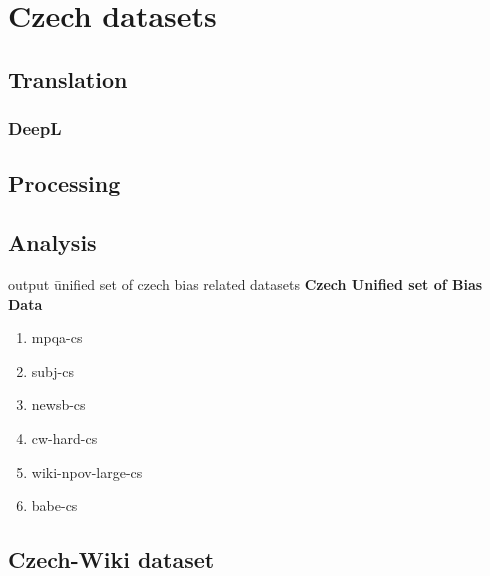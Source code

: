 \chapter{Czech datasets}
\section{Translation}
\subsection{DeepL}
\section{Processing}
\section{Analysis}
output \= unified set of czech bias related datasets
\textbf{Czech Unified set of Bias Data}
\begin{enumerate}
    \item mpqa-cs
    \item subj-cs
    \item newsb-cs
    \item cw-hard-cs
    \item wiki-npov-large-cs
    \item babe-cs
\end{enumerate}

\section{Czech-Wiki dataset }